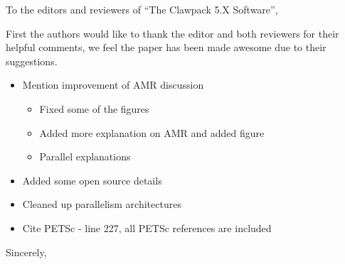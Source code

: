 \documentclass{letter}
\begin{document}
\address{Clawpack Developers}
\signature{Kyle T. Mandli, \\
           Aron J. Ahmadia, \\
           Donna Calhoun, \\
           David George, \\
           Yiannis Hadjimichael, \\ 
           David I. Ketcheson, \\
           Grady I. Lemoine, and \\
           Randall J. LeVeque}

\begin{letter}
{
}

\opening{To the editors and reviewers of ``The Clawpack 5.X Software'',}

First the authors would like to thank the editor and both reviewers for their
helpful comments, we feel the paper has been made awesome due to their
suggestions.

\begin{itemize}
    \item Mention improvement of AMR discussion
    \begin{itemize}
        \item Fixed some of the figures
        \item Added more explanation on AMR and added figure
        \item Parallel explanations
    \end{itemize}
    \item Added some open source details
    \item Cleaned up parallelism architectures
    \item Cite PETSc - line 227, all PETSc references are included
\end{itemize}

\vspace{4cm}

\closing{Sincerely,}

\end{letter}
\end{document}
